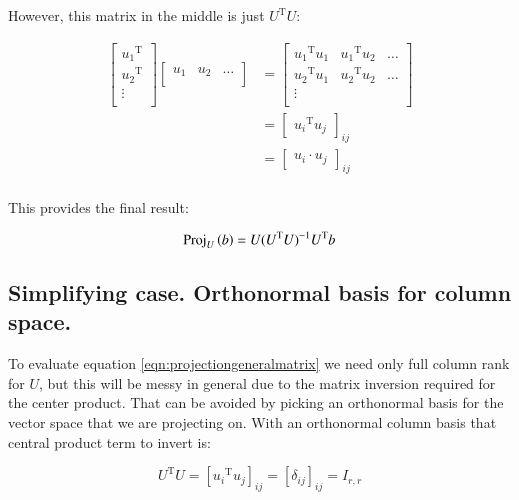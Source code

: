 \documentclass{article}      %
\newcommand{\transpose}[1]{{{#1}^{\text{T}}}}
\begin{document}
However, this matrix in the middle is just $\transpose{U} U$:

\begin{align*}
\begin{bmatrix}
\transpose{u_1} \\
\transpose{u_2} \\
\vdots \\
\end{bmatrix}
\begin{bmatrix}
{u_1} & {u_2} & \hdots \\
\end{bmatrix}
&=
\begin{bmatrix}
\transpose{u_1} {u_1} & \transpose{u_1} {u_2} & \hdots \\
\transpose{u_2} {u_1} & \transpose{u_2} {u_2} & \hdots \\
\vdots & & \\
\end{bmatrix} \\
&=
{
\begin{bmatrix}
\transpose{u_i} {u_j}
\end{bmatrix}
}_{ij} \\
&=
{
\begin{bmatrix}
{u_i} \cdot {u_j}
\end{bmatrix}
}_{ij} \\
\end{align*}

This provides the final result:

\begin{equation}\label{eqn:projectiongeneralmatrix}
\Proj_{U}\left(b\right) = U (\transpose{U} U)^{-1} \transpose{U} b
\end{equation}

\subsection{ Simplifying case.  Orthonormal basis for column space. }

To evaluate equation \ref{eqn:projectiongeneralmatrix} we need only full column rank for $U$, but this will be messy in general due to the matrix inversion required for the center product.  That can be avoided by picking an orthonormal basis for the vector space that we are projecting on.  With an orthonormal column basis that 
central product term to invert is:

\[
\transpose{U} U = [ \transpose{u_i} u_j ]_{ij} = [ \delta_{ij} ]_{ij} = I_{r,r}
\]
\end{document}
